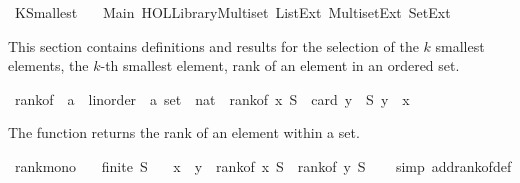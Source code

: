 %
\begin{isabellebody}%
%
%
\isadelimdocument
%
\endisadelimdocument
%
\isatagdocument
%
\isamarkuptrue%
%
\endisatagdocument
{\isafolddocument}%
%
\isadelimdocument
%
\endisadelimdocument
%
\isadelimtheory
%
\endisadelimtheory
%
\isatagtheory
{}\isamarkupfalse%
\ K{\isacharunderscore}{\kern0pt}Smallest\isanewline
\ \ \ Main\ {\isachardoublequoteopen}HOL{\isacharminus}{\kern0pt}Library{\isachardot}{\kern0pt}Multiset{\isachardoublequoteclose}\ List{\isacharunderscore}{\kern0pt}Ext\ Multiset{\isacharunderscore}{\kern0pt}Ext\ Set{\isacharunderscore}{\kern0pt}Ext\isanewline
{}%
\endisatagtheory
{\isafoldtheory}%
%
\isadelimtheory
%
\endisadelimtheory
%
\begin{isamarkuptext}%
This section contains definitions and results for the selection of the $k$ smallest elements, the $k$-th smallest element, rank of an element in an ordered set.%
\end{isamarkuptext}\isamarkuptrue%
\isamarkupfalse%
\ rank{\isacharunderscore}{\kern0pt}of\ {\isacharcolon}{\kern0pt}{\isacharcolon}{\kern0pt}\ {\isachardoublequoteopen}{\isacharprime}{\kern0pt}a\ {\isacharcolon}{\kern0pt}{\isacharcolon}{\kern0pt}\ linorder\ {\isasymRightarrow}\ {\isacharprime}{\kern0pt}a\ set\ {\isasymRightarrow}\ nat{\isachardoublequoteclose}\ \ {\isachardoublequoteopen}rank{\isacharunderscore}{\kern0pt}of\ x\ S\ {\isacharequal}{\kern0pt}\ card\ {\isacharbraceleft}{\kern0pt}y\ {\isasymin}\ S{\isachardot}{\kern0pt}\ y\ {\isacharless}{\kern0pt}\ x{\isacharbraceright}{\kern0pt}{\isachardoublequoteclose}%
\begin{isamarkuptext}%
The function  returns the rank of an element within a set.%
\end{isamarkuptext}\isamarkuptrue%
\isamarkupfalse%
\ rank{\isacharunderscore}{\kern0pt}mono{\isacharcolon}{\kern0pt}\isanewline
\ \ \ {\isachardoublequoteopen}finite\ S{\isachardoublequoteclose}\isanewline
\ \ \ {\isachardoublequoteopen}x\ {\isasymle}\ y\ {\isasymLongrightarrow}\ rank{\isacharunderscore}{\kern0pt}of\ x\ S\ {\isasymle}\ rank{\isacharunderscore}{\kern0pt}of\ y\ S{\isachardoublequoteclose}\isanewline
%
\isadelimproof
\ \ %
\endisadelimproof
%
\isatagproof
{}\isamarkupfalse%
\ {\isacharparenleft}{\kern0pt}simp\ add{\isacharcolon}{\kern0pt}rank{\isacharunderscore}{\kern0pt}of{\isacharunderscore}{\kern0pt}def{\isacharparenright}{\kern0pt}\isanewline

\end{isabellebody}
